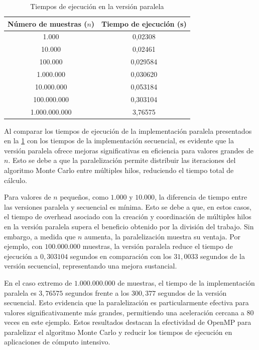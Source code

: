 \documentclass[a4paper, 10pt, onecolumn]{IEEEtran}
\begin{document}
\begin{table}[H]
	\centering
	\begin{tabular}{|c|c|}
		\hline
		\textbf{Número de muestras ($n$)} & \textbf{Tiempo de ejecución (s)} \\
		\hline
		1.000         & 0,02308 \\
		10.000        & 0,02461 \\
		100.000       & 0,029584 \\
		1.000.000     & 0,030620 \\
		10.000.000    & 0,053184 \\
		100.000.000   & 0,303104 \\
		1.000.000.000 & 3,76575 \\
		\hline
	\end{tabular}
	\caption{Tiempos de ejecución en la versión paralela}
	\label{tab:parallel_execution_times}
\end{table}

Al comparar los tiempos de ejecución de la implementación paralela presentados en la \cref{tab:parallel_execution_times} con los tiempos de la implementación secuencial, es evidente que la versión paralela ofrece mejoras significativas en eficiencia para valores grandes de $n$. Esto se debe a que la paralelización permite distribuir las iteraciones del algoritmo Monte Carlo entre múltiples hilos, reduciendo el tiempo total de cálculo.

Para valores de $n$ pequeños, como $1.000$ y $10.000$, la diferencia de tiempo entre las versiones paralela y secuencial es mínima. Esto se debe a que, en estos casos, el tiempo de overhead asociado con la creación y coordinación de múltiples hilos en la versión paralela supera el beneficio obtenido por la división del trabajo. Sin embargo, a medida que $n$ aumenta, la paralelización muestra su ventaja. Por ejemplo, con $100.000.000$ muestras, la versión paralela reduce el tiempo de ejecución a $0,303104$ segundos en comparación con los $31,0033$ segundos de la versión secuencial, representando una mejora sustancial.

En el caso extremo de $1.000.000.000$ de muestras, el tiempo de la implementación paralela es $3,76575$ segundos frente a los $300,377$ segundos de la versión secuencial. Esto evidencia que la paralelización es particularmente efectiva para valores significativamente más grandes, permitiendo una aceleración cercana a $80$ veces en este ejemplo. Estos resultados destacan la efectividad de OpenMP para paralelizar el algoritmo Monte Carlo y reducir los tiempos de ejecución en aplicaciones de cómputo intensivo.
\end{document}
